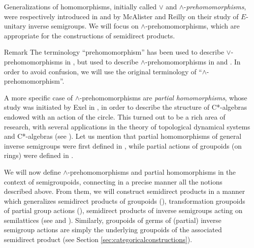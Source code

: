 Generalizations of homomorphisms, initially called $\lor$ and $\land$-\emph{prehomomorphisms}, were respectively introduced in \cite[Definition 1.1]{MR0424979} and \cite[Definition 4.1]{MR0470123} by McAlister and Reilly on their study of $E$-unitary inverse semigroups. We will focus on $\land$-prehomomorphisms, which are appropriate for the constructions of semidirect products.

\begin{denv*}{Remark}
    The terminology ``prehomomorphism'' has been used to describe  $\lor$-prehomomorphisms in \cite[p.\ 80]{MR1694900}, but used to describe $\land$-prehomomorphisms in \cite[VI.7.2]{MR752899} and \cite{Mikola2017}. In order to avoid confusion, we will use the original terminology of ``$\land$-prehomomorphism''.
\end{denv*}

A more specific case of $\land$-prehomomorphisms are \emph{partial homomorphisms}, whose study was initiated by Exel in \cite{MR1276163}, in order to describe the structure of C*-algebras endowed with an action of the circle. This turned out to be a rich area of research, with several applications in the theory of topological dynamical systems and C*-algebras (see \cite{MR2799098,MR3699795}). Let us mention that partial homomorphisms of general inverse semigroups were first defined in \cite{MR3231479}, while partial actions of groupoids (on rings) were defined in \cite{MR2982887}.

We will now define $\land$-prehomomorphisms and partial homomorphisms in the context of semigroupoids, connecting in a precise manner all the notions described above. From them, we will construct semidirect products in a manner which generalizes semidirect products of groupoids (\cite[Exercise 11.5.1]{MR2273730}), transformation groupoids of partial group actions (\cite{MR2045419}), semidirect products of inverse semigroups acting on semilattices (see \cite[Lemma 1.1]{MR0357660.1} and \cite[VI.7.6-7]{MR752899}). Similarly, groupoids of germs of (partial) inverse semigroup actions are simply the underlying groupoids of the associated semidirect product (see Section \ref{sec:categoricalconstructions}).

